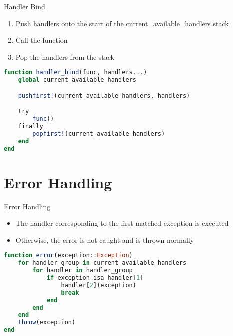 \documentclass{beamer}
\begin{document}
\begin{frame}[fragile,t]{Handler Bind}

\vfill

\begin{enumerate}
    \item Push handlers onto the start of the current\_available\_handlers stack
    \item Call the function
    \item Pop the handlers from the stack
\end{enumerate}

\vfill

\begin{lstlisting}[language=julia, style=jlcodestyle]
function handler_bind(func, handlers...)
    global current_available_handlers

    pushfirst!(current_available_handlers, handlers)

    try
        func()
    finally
        popfirst!(current_available_handlers)
    end
end
\end{lstlisting}

\end{frame}

\section{Error Handling}

\begin{frame}[fragile,t]{Error Handling}

\vfill

\begin{itemize}
    \item The handler corresponding to the first matched exception is executed
    \item Otherwise, the error is not caught and is thrown normally
\end{itemize}

\vfill

\begin{lstlisting}[language=julia, style=jlcodestyle]
function error(exception::Exception)
    for handler_group in current_available_handlers
        for handler in handler_group
            if exception isa handler[1]
                handler[2](exception)
                break
            end
        end
    end
    throw(exception)
end
\end{lstlisting}

\end{frame}
\end{document}
